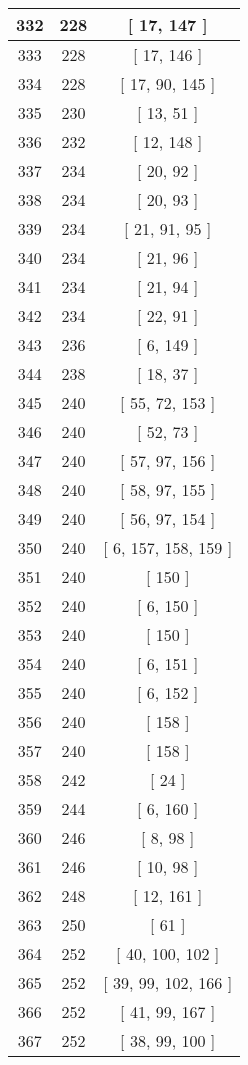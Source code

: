 \begin{center}
\begin{longtable}[H]{|| c c c ||}
332 & 228 & [ 17, 147 ]
\\\hline
333 & 228 & [ 17, 146 ]
\\\hline
334 & 228 & [ 17, 90, 145 ]
\\\hline
335 & 230 & [ 13, 51 ]
\\\hline
336 & 232 & [ 12, 148 ]
\\\hline
337 & 234 & [ 20, 92 ]
\\\hline
338 & 234 & [ 20, 93 ]
\\\hline
339 & 234 & [ 21, 91, 95 ]
\\\hline
340 & 234 & [ 21, 96 ]
\\\hline
341 & 234 & [ 21, 94 ]
\\\hline
342 & 234 & [ 22, 91 ]
\\\hline
343 & 236 & [ 6, 149 ]
\\\hline
344 & 238 & [ 18, 37 ]
\\\hline
345 & 240 & [ 55, 72, 153 ]
\\\hline
346 & 240 & [ 52, 73 ]
\\\hline
347 & 240 & [ 57, 97, 156 ]
\\\hline
348 & 240 & [ 58, 97, 155 ]
\\\hline
349 & 240 & [ 56, 97, 154 ]
\\\hline
350 & 240 & [ 6, 157, 158, 159 ]
\\\hline
351 & 240 & [ 150 ]
\\\hline
352 & 240 & [ 6, 150 ]
\\\hline
353 & 240 & [ 150 ]
\\\hline
354 & 240 & [ 6, 151 ]
\\\hline
355 & 240 & [ 6, 152 ]
\\\hline
356 & 240 & [ 158 ]
\\\hline
357 & 240 & [ 158 ]
\\\hline
358 & 242 & [ 24 ]
\\\hline
359 & 244 & [ 6, 160 ]
\\\hline
360 & 246 & [ 8, 98 ]
\\\hline
361 & 246 & [ 10, 98 ]
\\\hline
362 & 248 & [ 12, 161 ]
\\\hline
363 & 250 & [ 61 ]
\\\hline
364 & 252 & [ 40, 100, 102 ]
\\\hline
365 & 252 & [ 39, 99, 102, 166 ]
\\\hline
366 & 252 & [ 41, 99, 167 ]
\\\hline
367 & 252 & [ 38, 99, 100 ]
\\\hline

\end{longtable}
\end{center}
